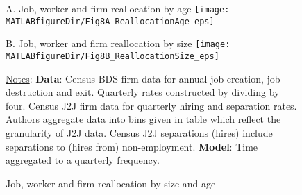 \begin{figure}[t]
\begin{center}
\small{A. Job, worker and firm reallocation by age}\vspace{.2cm}
\hspace*{-0.5cm}\texttt{[image: \\MATLABfigureDir/Fig8A\_ReallocationAge\_eps]}\vspace{.2cm}

\small{B. Job, worker and firm reallocation by size}\vspace{.2cm}
\hspace*{-0.5cm}\texttt{[image: \\MATLABfigureDir/Fig8B\_ReallocationSize\_eps]}
\caption{Job, worker and firm reallocation by size and age}\label{figure:Reallocation}\vspace*{-0.3cm}
\end{center}
\footnotesize{
\underline{Notes}:
\textbf{Data}:
Census BDS firm data for annual job creation, job destruction and exit.
Quarterly rates constructed by dividing by four.
Census J2J firm data for quarterly hiring and separation rates.
Authors aggregate data into bins given in table which reflect the granularity of J2J data.
Census J2J separations (hires) include separations to (hires from) non-employment.
\textbf{Model}:
Time aggregated to a quarterly frequency.
}
\end{figure}

